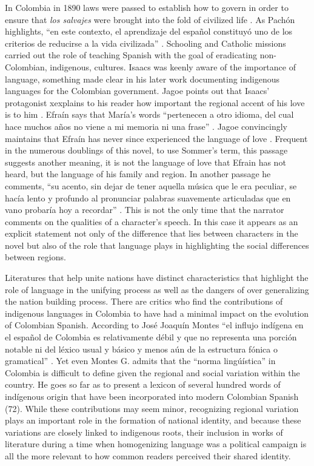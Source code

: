 \documentclass[12pt]{report}
\begin{document}
In Colombia in 1890 laws were passed to establish how to govern in order to ensure that \textit{los salvajes} were brought into the fold of civilized life \autocite[158]{Montes1997}. 
As Pachón highlights, \enquote{en este contexto, el aprendizaje del español constituyó uno de los criterios de reducirse a la vida civilizada} \autocite[158]{Montes1997}. 
Schooling and Catholic missions carried out the role of teaching Spanish with the goal of eradicating non-Colombian, indigenous, cultures. 
Isaacs was keenly aware of the importance of language, something made clear in his later work documenting indigenous languages for the Colombian government.
Jagoe points out that Isaacs' protagonist xexplains to his reader how important the regional accent of his love is to him \autocite[153]{Jagoe2003}.
Efraín says that María’s words \enquote{pertenecen a otro idioma, del cual hace muchos años no viene a mi memoria ni una frase} \autocite[78]{Isaacs2012}.
Jagoe convincingly maintains that Efraín has never since experienced the language of love \autocite[153]{Jagoe2003}.
Frequent in the numerous doublings of this novel, to use Sommer's term, this passage suggests another meaning, it is not the language of love that Efrain has not heard, but the language of his family and region.
In another passage he comments, \enquote{su acento, sin dejar de tener aquella música que le era peculiar, se hacía lento y profundo al pronunciar palabras suavemente articuladas que en vano probaría hoy a recordar} \autocite[78]{Isaacs2012}.
This is not the only time that the narrator comments on the qualities of a character's speech.
In this case it appears as an explicit statement not only of the difference that lies between characters in the novel but also of the role that language plays in highlighting the social differences between regions.

Literatures that help unite nations have distinct characteristics that highlight the role of language in the unifying process as well as the dangers of over generalizing the nation building process. 
There are critics who find the contributions of indigenous languages in Colombia to have had a minimal impact on the evolution of Colombian Spanish. 
According to José Joaquín Montes \enquote{el influjo indígena en el español de Colombia es relativamente débil y que no representa una porción notable ni del léxico usual y básico y menos aún de la estructura fónica o gramatical} \autocite[72]{Montes1997}. 
Yet even Montes G. admits that the \enquote{norma lingúística} in Colombia is difficult to define given the regional and social variation within the country. 
He goes so far as to present a lexicon of several hundred words of indígenous origin that have been incorporated into modern Colombian Spanish (72). 
While these contributions may seem minor, recognizing regional variation plays an important role in the formation of national identity, and because these variations are closely linked to indigenous roots, their inclusion in works of literature during a time when homogenizing language was a political campaign is all the more relevant to how common readers perceived their shared identity. 
\end{document}
